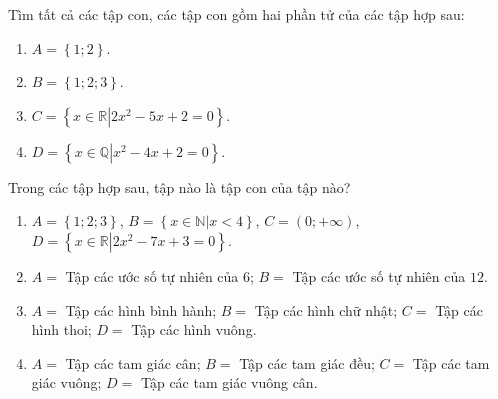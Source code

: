 \begin{bt}%
	Tìm tất cả các tập con, các tập con gồm hai phần tử của các  tập hợp sau:
	\begin{enumerate}
		\item  $A=\left\{{1;2}\right\}$.
		\item $B=\left\{{1;2;3}\right\}$. 
		 \item $C=\left\{{x\in \mathbb{R}\left|{2x^2-5x+2=0}\right.}\right\}$.
		\item $D=\left\{{x\in \mathbb{Q}\left|{x^2-4x+2=0}\right.}\right\}$. 
	\end{enumerate}
\end{bt}

\begin{bt}%
	Trong các tập hợp sau,  tập nào là tập con của tập nào?
	\begin{enumerate}
		\item $A=\left\{{1;2;3}\right\}$, $B=\left\{{x\in  \mathbb{N}\left|{x<4}\right.}\right\}$, $C=\left(0;+\infty\right)$, $D=\left\{{x\in \mathbb{R}\left|{2x^2-7x+3=0}\right.}\right\}$.
		\item $A=$ Tập các ước số tự nhiên của $6$; $B=$ Tập các ước số tự nhiên của  $12$.
		\item $A=$ Tập các hình bình hành; $B=$ Tập các  hình chữ nhật;
		$C=$ Tập các hình thoi; $D=$ Tập các hình  vuông.
		\item $A=$ Tập các tam  giác cân; $B=$ Tập các tam giác đều;
		$C=$ Tập các tam giác vuông; $D=$ Tập  các tam giác vuông cân.
	\end{enumerate}
\end{bt}

